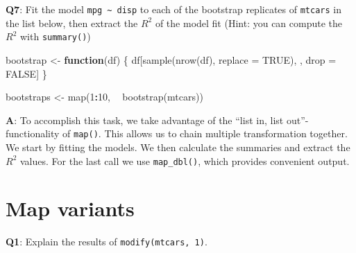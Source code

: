\documentclass[
]{krantz}
\makeatletter
\newenvironment{Shaded}{\begin{snugshade}}{\end{snugshade}}
\newcommand{\CommentTok}[1]{\textcolor[rgb]{0.56,0.35,0.01}{\textit{#1}}}
\newcommand{\ControlFlowTok}[1]{\textcolor[rgb]{0.13,0.29,0.53}{\textbf{#1}}}
\newcommand{\DataTypeTok}[1]{\textcolor[rgb]{0.13,0.29,0.53}{#1}}
\newcommand{\DecValTok}[1]{\textcolor[rgb]{0.00,0.00,0.81}{#1}}
\newcommand{\KeywordTok}[1]{\textcolor[rgb]{0.13,0.29,0.53}{\textbf{#1}}}
\newcommand{\NormalTok}[1]{#1}
\newcommand{\OperatorTok}[1]{\textcolor[rgb]{0.81,0.36,0.00}{\textbf{#1}}}
\newcommand{\OtherTok}[1]{\textcolor[rgb]{0.56,0.35,0.01}{#1}}
\newcommand{\StringTok}[1]{\textcolor[rgb]{0.31,0.60,0.02}{#1}}
\newenvironment{kframe}{%
\medskip{}
\setlength{\fboxsep}{.8em}
 \def\at@end@of@kframe{}%
 \ifinner\ifhmode%
  \def\at@end@of@kframe{\end{minipage}}%
  \begin{minipage}{\columnwidth}%
 \fi\fi%
 \def\FrameCommand##1{\hskip\@totalleftmargin \hskip-\fboxsep
 \colorbox{shadecolor}{##1}\hskip-\fboxsep
     \hskip-\linewidth \hskip-\@totalleftmargin \hskip\columnwidth}%
 \MakeFramed {\advance\hsize-\width
   \@totalleftmargin\z@ \linewidth\hsize
   \@setminipage}}%
 {\par\unskip\endMakeFramed%
 \at@end@of@kframe}
\renewenvironment{Shaded}{\begin{kframe}}{\end{kframe}}
\renewcommand{\KeywordTok} [1]{\textcolor[rgb]{0.00,0.44,0.13}{{#1}}}
\renewcommand{\DataTypeTok}[1]{\textcolor[rgb]{0.56,0.13,0.00}{{#1}}}
\renewcommand{\DecValTok}  [1]{\textcolor[rgb]{0.25,0.63,0.44}{{#1}}}
\renewcommand{\StringTok}  [1]{\textcolor[rgb]{0.25,0.44,0.63}{{#1}}}
\renewcommand{\CommentTok} [1]{\textcolor[rgb]{0.38,0.63,0.69}{{#1}}}
\renewcommand{\OtherTok}   [1]{\textcolor[rgb]{0.00,0.44,0.13}{{#1}}}
\renewcommand{\NormalTok}  [1]{{#1}}
\makeatother
\begin{document}
\textbf{{Q7}}: Fit the model \texttt{mpg\ \textasciitilde{}\ disp} to each of the bootstrap replicates of \texttt{mtcars} in the list below, then extract the \(R^2\) of the model fit (Hint: you can compute the \(R^2\) with \texttt{summary()})

\begin{Shaded}
\begin{Highlighting}[]
\NormalTok{bootstrap <-}\StringTok{ }\ControlFlowTok{function}\NormalTok{(df) \{}
\NormalTok{  df[}\KeywordTok{sample}\NormalTok{(}\KeywordTok{nrow}\NormalTok{(df), }\DataTypeTok{replace =} \OtherTok{TRUE}\NormalTok{), , drop =}\StringTok{ }\OtherTok{FALSE}\NormalTok{]}
\NormalTok{\}}

\NormalTok{bootstraps <-}\StringTok{ }\KeywordTok{map}\NormalTok{(}\DecValTok{1}\OperatorTok{:}\DecValTok{10}\NormalTok{, }\OperatorTok{~}\StringTok{ }\KeywordTok{bootstrap}\NormalTok{(mtcars))}
\end{Highlighting}
\end{Shaded}

\textbf{{A}}: To accomplish this task, we take advantage of the ``list in, list out''-functionality of \texttt{map()}. This allows us to chain multiple transformation together. We start by fitting the models. We then calculate the summaries and extract the \(R^2\) values. For the last call we use \texttt{map\_dbl()}, which provides convenient output.

\begin{Shaded}
\end{Shaded}


\hypertarget{map-variants}{%
\section{Map variants}\label{map-variants}}

\textbf{{Q1}}: Explain the results of \texttt{modify(mtcars,\ 1)}.
\end{document}
